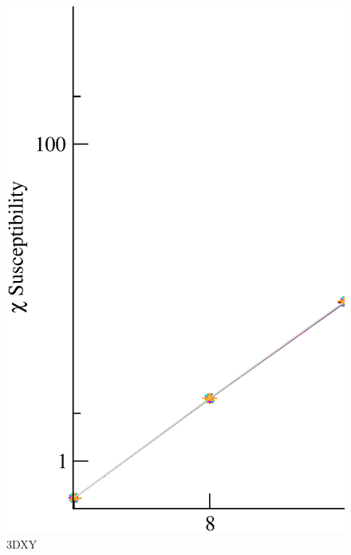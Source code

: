 \begin{figure}[!htpb]
  \centering
  \includegraphics[width=15cm]{./plots/3DXY/3DXY_Susceptibility_vs_L.eps}
  \caption{3DXY}
\end{figure}

